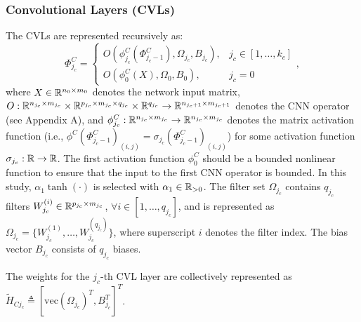 \documentclass[letterpaper, journal]{IEEEtran}
\newcommand{\PhiC}{\Phi_{j_c}^{C}}
\newcommand{\phiC}{\phi_{j_c}^{C}}
\newcommand{\tH}{\tilde{H}}
\begin{document}
\subsubsection{Convolutional Layers (CVLs)}
The CVLs are represented recursively as:
\begin{equation}\label{eq:cvl_output}
  \PhiC 
  = 
  \begin{cases} 
    O(\phiC(\Phi_{j_c-1}^{C}),
    \Omega_{j_c},B_{j_c}), 
    & 
    j_c \in [1,\dots,k_c] \\ 
    O(\phi_{0}^{C}(X),\Omega_{0},B_{0}), 
    & 
    j_c = 0 
  \end{cases}
  ,
\end{equation}
where $X \in \mathbb{R}^{n_0 \times m_0}$ denotes the network input matrix, $O:\mathbb{R}^{n_{j_c} \times m_{j_c}} \times \mathbb{R}^{p_{j_c} \times m_{j_c} \times q_{j_c}} \times \mathbb{R}^{q_{j_c}} \to \mathbb{R}^{n_{j_c+1} \times m_{j_c+1}}$ denotes the CNN operator (see Appendix A), and $\phiC:\R^{n_{j_c} \times m_{j_c}} \to \R^{n_{j_c} \times m_{j_c}}$ denotes the matrix activation function (i.e., $\phi^C(\Phi_{j_c-1}^{C})_{(i,j)} = \sigma_{j_c}(\Phi_{j_c-1}^{C})_{(i,j)}$) for some activation function $\sigma_{j_c}: \mathbb{R} \to \mathbb{R}$. 
The first activation function $\phi_{0}^{C}$ should be a bounded nonlinear function to ensure that the input to the first CNN operator is bounded. 
In this study, $\alpha_1 \tanh(\cdot)$ is selected with $\alpha_1 \in \mathbb{R}_{>0}$. 
The filter set $\Omega_{j_c}$ contains $q_{j_c}$ filters $W_{j_c}^{(i)} \in \mathbb{R}^{p_{j_c} \times m_{j_c}}$, $\forall i \in [1,\dots,q_{j_c}]$, and is represented as $\Omega_{j_c} = \{W_{j_c}^{(1)},\dots,W_{j_c}^{(q_{j_c})}\}$, where superscript $i$ denotes the filter index. The bias vector $B_{j_c}$ consists of $q_{j_c}$ biases.

The weights for the $j_c$-th CVL layer are collectively represented as
$\tH_{Cj_c} \triangleq [\text{vec}(\Omega_{j_c})^T, B_{j_c}^T]^T$.
\end{document}
